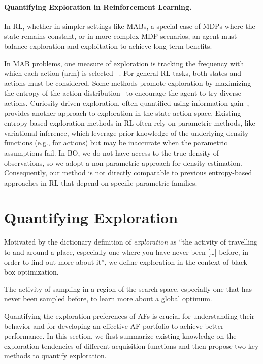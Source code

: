 \documentclass[accepted]{uai2025}
\begin{document}
\paragraph{Quantifying Exploration in Reinforcement Learning.}
In \ac{RL}, whether in simpler settings like \acp{MAB}, a special case of \acp{MDP} where the state remains constant, or in more complex \ac{MDP} scenarios, an agent must balance exploration and exploitation to achieve long-term benefits.

In \ac{MAB} problems, one measure of exploration is tracking the frequency with which each action (arm) is selected ~\citep{kuleshov2014algorithms}. For general \ac{RL} tasks, both states and actions must be considered. 
Some methods promote exploration by maximizing the entropy of the action distribution~\citep{williams1991function,ahmed2019understanding} to encourage the agent to try diverse actions. 
Curiosity-driven exploration, often quantified using information gain~\citep{sun2011planning,houthooft2016vime}, provides another approach to exploration in the state-action space. 
Existing entropy-based exploration methods in \ac{RL} often rely on parametric methods, like variational inference, which leverage prior knowledge of the underlying density functions (e.g., for actions) but may be inaccurate when the parametric assumptions fail. In \ac{BO}, we do not have access to the true density of observations, so we adopt a non-parametric approach for density estimation. Consequently, our method is not directly comparable to previous entropy-based approaches in \ac{RL} that depend on specific parametric families.

\section{Quantifying Exploration}
\label{sec:metrics}
Motivated by the \cite{dictionary} dictionary definition of \emph{exploration} as ``the activity of travelling to and around a place, especially one where you have never been [\ldots] before, in order to find out more about it'', we define exploration in the context of black-box optimization. 
\begin{definition}[Exploration]
    The activity of sampling in a region of the search space, especially one that has never been sampled before, to learn more about a global optimum.
\end{definition}
Quantifying the exploration preferences of \acp{AF} is crucial for understanding their behavior and for developing an effective \ac{AF} portfolio to achieve better performance. In this section, we first summarize existing knowledge on the exploration tendencies of different acquisition functions and then propose two key methods to quantify exploration.
\end{document}
